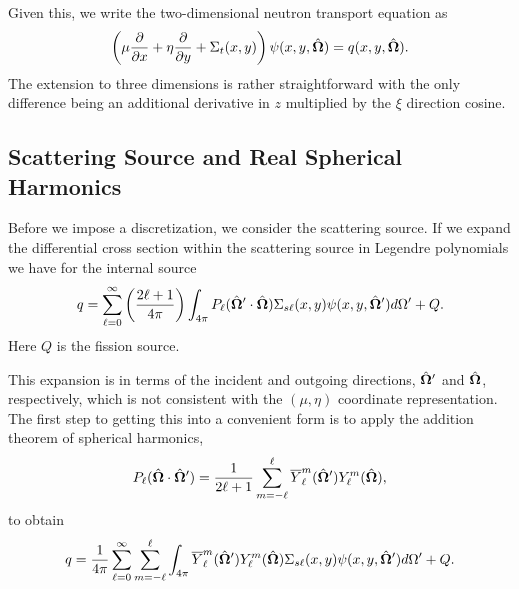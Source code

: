 Given this, we write the two-dimensional neutron transport equation as
\begin{align}
  \left( \mu \frac{ \partial {} }{ \partial {x} }+ \eta \frac{ \partial {} }{ \partial {y} }  + \Sigma_t(x,y)  \right) \psi(x,y,\hat{\mathbf{\Omega}}) = q(x,y,\hat{\mathbf{\Omega}}) .
\end{align}
The extension to three dimensions is rather straightforward with the only difference being an additional derivative in $z$ multiplied by the $\xi$ direction cosine.




\subsection{Scattering Source and Real Spherical Harmonics}

Before we impose a discretization, we consider the scattering source. If we expand the differential cross section within the scattering source in Legendre polynomials we have for the internal source
\begin{align}
  q = \sum_{\ell = 0}^\infty  \left( \frac{  2\ell + 1 }{ 4\pi } \right) \int_{4\pi}  P_\ell( \hat{\mathbf{\Omega}}' \cdot \hat{\mathbf{\Omega}} ) \Sigma_{s\ell}(x,y) \psi(x,y,\hat{\mathbf{\Omega}}') d\Omega' + Q.
\end{align}
Here $Q$ is the fission source. 

This expansion is in terms of the incident and outgoing directions, $\hat{\mathbf{\Omega}}'$ and $\hat{\mathbf{\Omega}}$, respectively, which is not consistent with the $(\mu,\eta)$ coordinate representation. The first step to getting this into a convenient form is to apply the addition theorem of spherical harmonics,
\begin{align}
  P_\ell(\hat{\mathbf{\Omega}} \cdot \hat{\mathbf{\Omega}}') = \frac{ 1 }{ 2\ell + 1 } \sum_{m=-\ell}^\ell \overline{Y}_\ell^m (\hat{\mathbf{\Omega}}') Y_\ell^m (\hat{\mathbf{\Omega}}),
\end{align}
to obtain
\begin{align} \label{Eq:transport_discreteOrdinatesSourceTerm_sphericalHarmonicExpansion}
  q = \frac{1}{4\pi} \sum_{\ell = 0}^\infty \sum_{m=-\ell}^\ell \int_{4\pi} \overline{Y}_\ell^m (\hat{\mathbf{\Omega}}') Y_\ell^m (\hat{\mathbf{\Omega}}) \Sigma_{s\ell}(x,y) \psi(x,y,\hat{\mathbf{\Omega}}') d\Omega' + Q.
\end{align}

